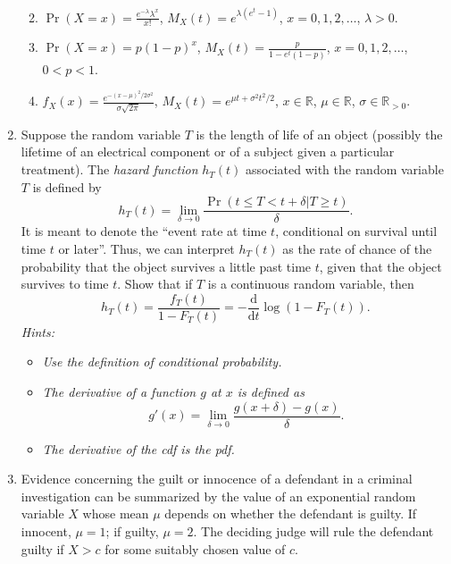 \documentclass[
]{book}
\newcommand{\bbR}{\mathbb{R}}
\newcommand{\ddif}{\text{d}}
\theoremstyle{definition}
\theoremstyle{definition}
\theoremstyle{definition}
\theoremstyle{definition}
\theoremstyle{remark}
\begin{document}
\begin{enumerate}
  \begin{enumerate}
  \def\labelenumii{(\alph{enumii})}
  \item
    \(\Pr(X=x)=\frac{e^{-\lambda}\lambda^x}{x!}\), \(M_X(t)=e^{\lambda(e^t - 1)}\), \(x=0,1,2,\dots\), \(\lambda>0\).
  \item
    \(\Pr(X=x)=p(1-p)^x\), \(M_X(t)=\frac{p}{1-e^t(1-p)}\), \(x=0,1,2,\dots\), \(0<p<1\).
  \item
    \(f_X(x)=\frac{e^{-(x-\mu)^2/2\sigma^2}}{\sigma\sqrt{2\pi}}\), \(M_X(t)=e^{\mu t+ \sigma^2t^2/2}\), \(x\in\bbR\), \(\mu\in\bbR\), \(\sigma\in\bbR_{> 0}\).
  \end{enumerate}
\item
  Suppose the random variable \(T\) is the length of life of an object (possibly the lifetime of an electrical component or of a subject given a particular treatment). The \emph{hazard function} \(h_T(t)\) associated with the random variable \(T\) is defined by
  \[
  h_T(t) = \lim_{\delta \to 0} \frac{\Pr(t \leq T < t+\delta | T \geq t)}{\delta}.
  \]
  It is meant to denote the ``event rate at time \(t\), conditional on survival until time \(t\) or later''.
  Thus, we can interpret \(h_T(t)\) as the rate of chance of the probability that the object survives a little past time \(t\), given that the object survives to time \(t\). Show that if \(T\) is a continuous random variable, then
  \[
  h_T(t) = \frac{f_T(t)}{1-F_T(t)}=-\frac{\ddif }{\ddif t} \log(1-F_T(t)).
  \]
  \emph{Hints:}

  \begin{itemize}
  \item
    \emph{Use the definition of conditional probability.}
  \item
    \emph{The derivative of a function \(g\) at \(x\) is defined as}
    \[
    g'(x) = \lim_{\delta \to 0} \frac{g(x+\delta) - g(x)}{\delta }.
    \]
  \item
    \emph{The derivative of the cdf is the pdf.}
  \end{itemize}
\item
  Evidence concerning the guilt or innocence of a defendant in a criminal investigation can be summarized by the value of an exponential random variable \(X\) whose mean \(\mu\) depends on whether the defendant is guilty. If innocent, \(\mu=1\); if guilty, \(\mu=2\). The deciding judge will rule the defendant guilty if \(X > c\) for some suitably chosen value of \(c\).


\end{enumerate}
\end{document}

